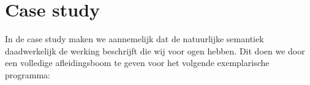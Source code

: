 
\chapter{Case study}

In de case study maken we aannemelijk dat de natuurlijke semantiek daadwerkelijk de werking beschrijft die wij voor ogen hebben. Dit doen we door een volledige afleidingsboom te geven voor het volgende exemplarische programma:

\newCodeFragment
\begin{minipage}{.5\textwidth}
\end{minipage}
\begin{minipage}{.5\textwidth}
\end{minipage}

